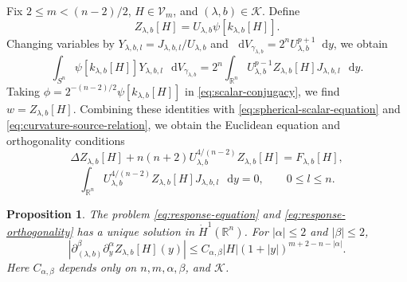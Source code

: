 \documentclass[11pt]{article}
\numberwithin{equation}{section}
\newtheorem{proposition}[theorem]{Proposition}
\theoremstyle{remark}
\newcommand{\R}{\mathbb R}
\newcommand{\Sph}{S}
\newcommand{\dd}{\mathop{}\!\mathrm{d}}
\begin{document}
Fix \(2\le m<(n-2)/2\), \(H\in\mathcal V_m\), and
\((\lambda,b)\in\mathcal K\). Define
\begin{equation}\label{eq:response-from-sphere}
 Z_{\lambda,b}[H]
 =U_{\lambda,b}\psi[k_{\lambda,b}[H]].
\end{equation}
{Changing variables by
\(Y_{\lambda,b,l}=J_{\lambda,b,l}/U_{\lambda,b}\) and
\(\dd V_{\gamma_{\lambda,b}}=2^nU_{\lambda,b}^{p+1}\dd y\), we obtain}
 {
\begin{equation}\label{eq:response-moment-transfer}
 \int_{\Sph^n}\psi[k_{\lambda,b}[H]]Y_{\lambda,b,l}
 \,\dd V_{\gamma_{\lambda,b}}
 =2^n\int_{\R^n}U_{\lambda,b}^{p-1}
 Z_{\lambda,b}[H]J_{\lambda,b,l}\,\dd y.
\end{equation}
}
{Taking
\(\phi=2^{-(n-2)/2}\psi[k_{\lambda,b}[H]]\) in
\eqref{eq:scalar-conjugacy}, we find \(w=Z_{\lambda,b}[H]\).
Combining these identities with \eqref{eq:spherical-scalar-equation} and
\eqref{eq:curvature-source-relation}, we obtain the}
Euclidean equation and orthogonality conditions
\begin{equation}\label{eq:response-equation}
 \Delta Z_{\lambda,b}[H]
 +n(n+2)U_{\lambda,b}^{4/(n-2)}Z_{\lambda,b}[H]
 =F_{\lambda,b}[H],
\end{equation}
\begin{equation}\label{eq:response-orthogonality}
 \int_{\R^n}U_{\lambda,b}^{4/(n-2)}
 Z_{\lambda,b}[H]J_{\lambda,b,l}\,\dd y=0,
 \qquad 0\le l\le n.
\end{equation}

\par
\begin{proposition}\label{prop:euclidean-response}
The problem \eqref{eq:response-equation}  and  \eqref{eq:response-orthogonality}
has a unique solution in \(\dot H^1(\R^n)\).
For \(|\alpha|\le2\) and \(|\beta|\le2\),
\begin{equation}\label{eq:response-decay}
 \left|
 \partial_{(\lambda,b)}^\beta\partial_y^\alpha
 Z_{\lambda,b}[H](y)\right|
 \le C_{\alpha,\beta}|H|
 (1+|y|)^{m+2-n-|\alpha|}.
\end{equation}
Here \(C_{\alpha,\beta}\) depends only on
\(n,m,\alpha,\beta\), and \(\mathcal K\).
\end{proposition}
\end{document}
